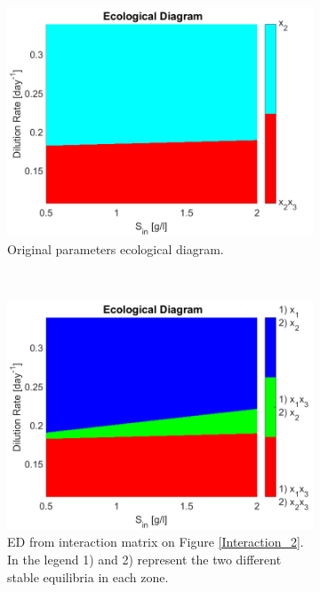 \documentclass[processes,article,submit,moreauthors,pdftex]{Definitions/mdpi}
\begin{document}
\begin{figure}[h]
	\centering
	\begin{subfigure}[t]{0.31\textwidth}
		\includegraphics[width=\textwidth]{Stability/ED_parameters_Dumont}
		\caption{Original parameters ecological diagram.}
		\label{ED 1}
	\end{subfigure}
	~
	\begin{subfigure}[t]{0.31\textwidth}
		\includegraphics[width=\textwidth]{Stability/ED_parameters_modified}
		\caption{ED from interaction matrix on Figure \ref{Interaction_2}. In the legend 1) and 2) represent the two different stable equilibria in each zone.}
		\label{ED 2}
	\end{subfigure}
	~
	\begin{subfigure}[t]{0.31\textwidth}

\end{subfigure}
\end{figure}
\end{document}
